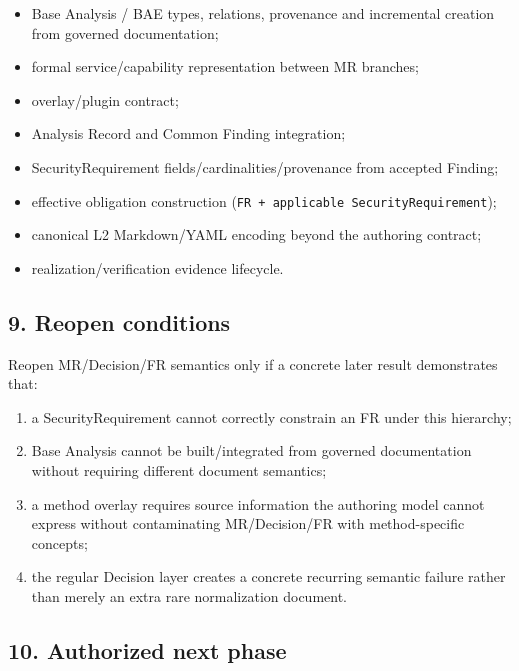 \documentclass[
  10pt,
]{article}
\providecommand{\tightlist}{%
  \setlength{\itemsep}{0pt}\setlength{\parskip}{0pt}}
\begin{document}
\begin{itemize}
\tightlist
\item
  Base Analysis / BAE types, relations, provenance and incremental
  creation from governed documentation;
\item
  formal service/capability representation between MR branches;
\item
  overlay/plugin contract;
\item
  Analysis Record and Common Finding integration;
\item
  SecurityRequirement fields/cardinalities/provenance from accepted
  Finding;
\item
  effective obligation construction
  (\texttt{FR\ +\ applicable\ SecurityRequirement});
\item
  canonical L2 Markdown/YAML encoding beyond the authoring contract;
\item
  realization/verification evidence lifecycle.
\end{itemize}

\subsection{9. Reopen conditions}\label{9-reopen-conditions}

Reopen MR/Decision/FR semantics only if a concrete later result
demonstrates that:

\begin{enumerate}
\def\labelenumi{\arabic{enumi}.}
\tightlist
\item
  a SecurityRequirement cannot correctly constrain an FR under this
  hierarchy;
\item
  Base Analysis cannot be built/integrated from governed documentation
  without requiring different document semantics;
\item
  a method overlay requires source information the authoring model
  cannot express without contaminating MR/Decision/FR with
  method-specific concepts;
\item
  the regular Decision layer creates a concrete recurring semantic
  failure rather than merely an extra rare normalization document.
\end{enumerate}

\subsection{10. Authorized next phase}\label{10-authorized-next-phase}
\end{document}
